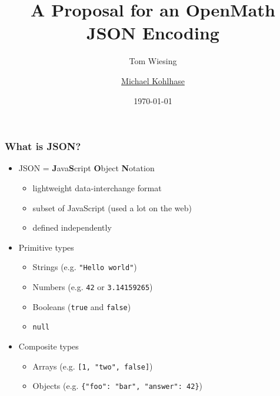 \documentclass[usenames,dvipsnames]{beamer}
\makeatletter
\let\lstinline@org\lstinline
\def\lstinline{\lstinline@org[basicstyle=\ttfamily]}
\makeatother
\begin{document}
\title{A Proposal for an OpenMath JSON Encoding}   
\author{Tom Wiesing\and\underline{Michael Kohlhase}} 
\date{\today} 

\begin{frame}
    \titlepage
\end{frame}

\begin{frame}[fragile]
    \frametitle{What is JSON?}
    \begin{itemize}
        \item JSON = \textbf{J}ava\textbf{S}cript \textbf{O}bject \textbf{N}otation%
        \begin{itemize}
            \item lightweight data-interchange format
            \item subset of JavaScript (used a lot on the web)
            \item defined independently
        \end{itemize}
        \item Primitive types
        \begin{itemize}
                \item Strings (e.g. \lstinline{"Hello world"})
                \item Numbers (e.g. \lstinline{42} or \lstinline{3.14159265})
                \item Booleans (\lstinline{true} and \lstinline{false})
                \item \lstinline{null}
        \end{itemize}
        \item Composite types
        \begin{itemize}
            \item Arrays (e.g. \lstinline{[1, "two", false]})
            \item Objects (e.g. \lstinline|{"foo": "bar", "answer": 42}|)
        \end{itemize}
    \end{itemize}
\end{frame}
\end{document}
